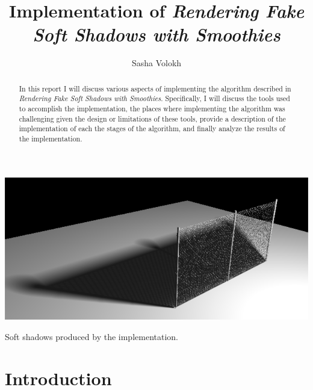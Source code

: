 \documentclass[sigconf]{acmart}
\begin{document}
\title{Implementation of \textit{Rendering Fake Soft Shadows with Smoothies}}

\author{Sasha Volokh}

\begin{abstract}

In this report I will discuss various aspects of implementing the algorithm described in \textit{Rendering Fake Soft Shadows with Smoothies}. Specifically, I will discuss the tools used to accomplish the implementation, the places where implementing the algorithm was challenging given the design or limitations of these tools, provide a description of the implementation of each the stages of the algorithm, and finally analyze the results of the implementation.

\end{abstract}

\begin{teaserfigure}
  \centering
  \includegraphics[width=6.0in]{reportfiles/teaser}
  \caption{Soft shadows produced by the implementation.}
\end{teaserfigure}

\maketitle

\section{Introduction}
\end{document}
